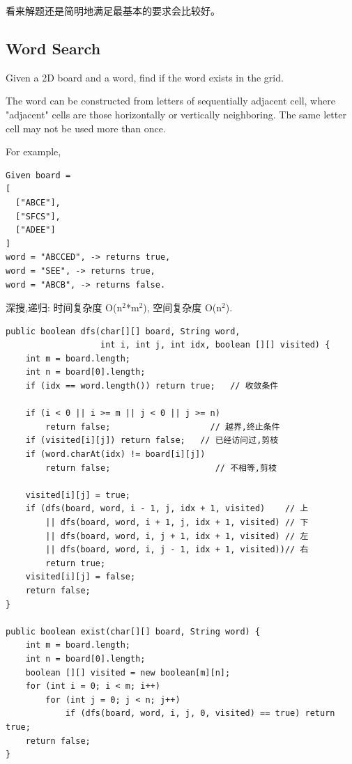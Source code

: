\documentclass[12pt]{book}
\begin{document}
看来解题还是简明地满足最基本的要求会比较好。

\subsection{Word Search}
\label{sec-11-2-4}
Given a 2D board and a word, find if the word exists in the grid.

The word can be constructed from letters of sequentially adjacent cell, where "adjacent" cells are those horizontally or vertically neighboring. The same letter cell may not be used more than once.

For example,
\lstset{language=java,label= ,caption= ,numbers=none}
\begin{lstlisting}
Given board =
[
  ["ABCE"],
  ["SFCS"],
  ["ADEE"]
]
word = "ABCCED", -> returns true,
word = "SEE", -> returns true,
word = "ABCB", -> returns false.
\end{lstlisting}

深搜,递归: 时间复杂度 O(n$^{\text{2}}$*m$^{\text{2}}$), 空间复杂度 O(n$^{\text{2}}$). 

\lstset{language=java,label= ,caption= ,numbers=none}
\begin{lstlisting}
public boolean dfs(char[][] board, String word,
                   int i, int j, int idx, boolean [][] visited) {
    int m = board.length;
    int n = board[0].length;
    if (idx == word.length()) return true;   // 收敛条件

    if (i < 0 || i >= m || j < 0 || j >= n)
        return false;                    // 越界,终止条件
    if (visited[i][j]) return false;   // 已经访问过,剪枝
    if (word.charAt(idx) != board[i][j])
        return false;                     // 不相等,剪枝

    visited[i][j] = true;
    if (dfs(board, word, i - 1, j, idx + 1, visited)    // 上
        || dfs(board, word, i + 1, j, idx + 1, visited) // 下
        || dfs(board, word, i, j + 1, idx + 1, visited) // 左
        || dfs(board, word, i, j - 1, idx + 1, visited))// 右
        return true;
    visited[i][j] = false;
    return false;
}

public boolean exist(char[][] board, String word) {
    int m = board.length;
    int n = board[0].length;
    boolean [][] visited = new boolean[m][n];
    for (int i = 0; i < m; i++) 
        for (int j = 0; j < n; j++) 
            if (dfs(board, word, i, j, 0, visited) == true) return true;
    return false;
}
\end{lstlisting}
\end{document}
